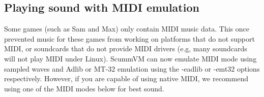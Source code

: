 

\subsection{Playing sound with MIDI emulation}

Some games (such as Sam and Max) only contain MIDI music data.  This once
prevented music for these games from working on platforms that do not support
MIDI, or soundcards that do not provide MIDI drivers (e.g, many soundcards will
not play MIDI under Linux). ScummVM can now emulate MIDI mode using sampled
waves and Adlib or MT-32 emulation using the -eadlib or -emt32 options respectively.  
However, if you are capable of using native MIDI, we recommend using one of the
MIDI modes below for best sound.
